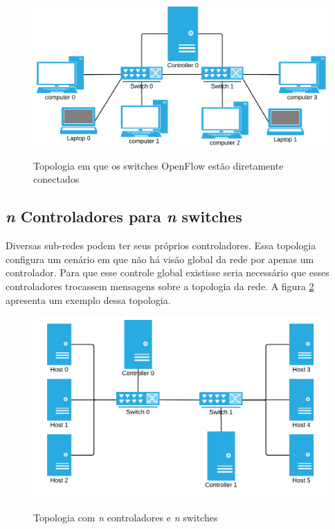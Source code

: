 \begin{figure}[h!]
    \centering
    \includegraphics[scale=0.8]{img/controller-n-linked-switches}
    \label{fig:controller-n-linked-switches}
    \caption{Topologia em que os switches OpenFlow 
    estão diretamente conectados}
\end{figure}


\subsection{\emph{n} Controladores para \emph{n} switches}

Diversas sub-redes podem ter seus próprios controladores.
Essa topologia configura um cenário em que não há visão global da rede 
por apenas um controlador. 
Para que esse controle global existisse seria necessário que esses 
controladores trocassem mensagens sobre a topologia da rede.
A figura \ref{fig:n-controllers-n-switches} apresenta um exemplo dessa 
topologia.

\begin{figure}[h!]
    \centering
    \includegraphics[scale=0.9]{img/n-controllers-n-switches}
    \label{fig:n-controllers-n-switches}
    \caption{Topologia com \emph{n} controladores e \emph{n} switches}
\end{figure}


